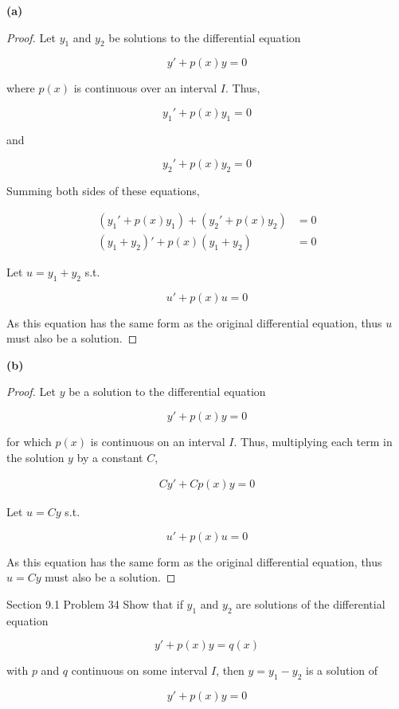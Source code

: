 \documentclass{article}
\begin{document}
    \textbf{(a)}
    \begin{proof}
        Let $y_1$ and $y_2$ be solutions to the differential equation

        \[
            y' + p(x)y = 0
        \]

        where $p(x)$ is continuous over an interval $I$. Thus,

        \[
            y_1' + p(x)y_1 = 0
        \]

        and

        \[
            y_2' + p(x)y_2 = 0
        \]

        Summing both sides of these equations,

        \begin{align*}
            (y_1' + p(x)y_1) + (y_2' + p(x)y_2) &= 0 \\
            (y_1 + y_2)' + p(x)(y_1 + y_2)      &= 0
        \end{align*}

        Let $u=y_1 + y_2$ s.t.

        \[
            u' + p(x)u = 0
        \]

        As this equation has the same form as the original differential equation, thus $u$ must also be a solution.
    \end{proof}

    \textbf{(b)} \\
    \begin{proof}
        Let $y$ be a solution to the differential equation

        \[
            y' + p(x)y = 0
        \]

        for which $p(x)$ is continuous on an interval $I$. Thus, multiplying each term in the solution $y$ by a constant $C$,

        \begin{align*}
            Cy' + Cp(x)y = 0
        \end{align*}

        Let $u=Cy$ s.t.

        \[
            u' + p(x)u = 0
        \]

        As this equation has the same form as the original differential equation, thus $u=Cy$ must also be a solution.
    \end{proof}

    

    \begin{tbhtheorem}{Section 9.1 Problem 34}
        Show that if $y_1$ and $y_2$ are solutions of the differential equation

        \[
            y' + p(x)y = q(x)
        \]

        with $p$ and $q$ continuous on some interval $I$, then $y=y_1 - y_2$ is a solution of

        \[
            y' + p(x) y = 0
        \]
    \end{tbhtheorem}
\end{document}
